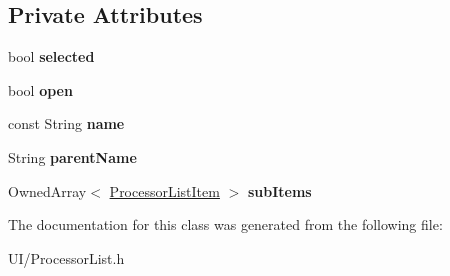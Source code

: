\subsection*{Private Attributes}
\begin{DoxyCompactItemize}
\item 
\hypertarget{classProcessorListItem_a46028c42696d75fda903936460121375}{bool {\bfseries selected}}\label{classProcessorListItem_a46028c42696d75fda903936460121375}

\item 
\hypertarget{classProcessorListItem_a1a5fdf7538185c713cead970246e8f07}{bool {\bfseries open}}\label{classProcessorListItem_a1a5fdf7538185c713cead970246e8f07}

\item 
\hypertarget{classProcessorListItem_a9da52430fee8d00b7d353316ab380e4a}{const String {\bfseries name}}\label{classProcessorListItem_a9da52430fee8d00b7d353316ab380e4a}

\item 
\hypertarget{classProcessorListItem_a7191b08412512838809572be524baddd}{String {\bfseries parent\-Name}}\label{classProcessorListItem_a7191b08412512838809572be524baddd}

\item 
\hypertarget{classProcessorListItem_ab2c39f7c1397420ffa15116b9f89b81f}{Owned\-Array$<$ \hyperlink{classProcessorListItem}{Processor\-List\-Item} $>$ {\bfseries sub\-Items}}\label{classProcessorListItem_ab2c39f7c1397420ffa15116b9f89b81f}

\end{DoxyCompactItemize}


The documentation for this class was generated from the following file\-:\begin{DoxyCompactItemize}
\item 
U\-I/Processor\-List.\-h\end{DoxyCompactItemize}
